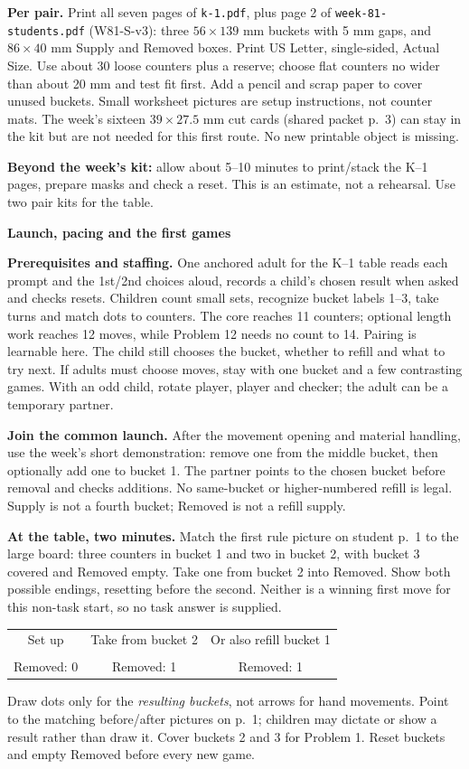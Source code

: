 \documentclass[11pt]{article}
\newcommand{\head}[1]{\par\textbf{\large #1}\par}
\newcommand{\buckets}[2]{%
\begin{tikzpicture}[x=1mm,y=1mm,baseline=0]
\foreach \x/\n/\lab in {0/#1/1,19/#2/2}{
 \draw[rounded corners=1mm] (\x,0) rectangle +(15,18);
 \node[font=\scriptsize] at (\x+7.5,-3) {\lab};
 \foreach \i in {1,...,\n}{
  \pgfmathsetmacro{\xx}{\x+3.5+mod(\i-1,3)*4}
  \pgfmathsetmacro{\yy}{3+floor((\i-1)/3)*4}
  \fill (\xx,\yy) circle (1.3);
 }
}
\end{tikzpicture}}
\begin{document}
\textbf{Per pair.} Print all seven pages of \texttt{k-1.pdf}, plus page 2 of \texttt{week-81-students.pdf} (W81-S-v3): three $56\times139$ mm buckets with 5 mm gaps, and $86\times40$ mm Supply and Removed boxes. Print US Letter, single-sided, Actual Size. Use about 30 loose counters plus a reserve; choose flat counters no wider than about 20 mm and test fit first. Add a pencil and scrap paper to cover unused buckets. Small worksheet pictures are setup instructions, not counter mats. The week's sixteen $39\times27.5$ mm cut cards (shared packet p.\ 3) can stay in the kit but are not needed for this first route. No new printable object is missing.

\textbf{Beyond the week's kit:} allow about 5--10 minutes to print/stack the K--1 pages, prepare masks and check a reset. This is an estimate, not a rehearsal. Use two pair kits for the table.
\newpage
\head{Launch, pacing and the first games}
\textbf{Prerequisites and staffing.} One anchored adult for the K--1 table reads each prompt and the 1st/2nd choices aloud, records a child's chosen result when asked and checks resets. Children count small sets, recognize bucket labels 1--3, take turns and match dots to counters. The core reaches 11 counters; optional length work reaches 12 moves, while Problem 12 needs no count to 14. Pairing is learnable here. The child still chooses the bucket, whether to refill and what to try next. If adults must choose moves, stay with one bucket and a few contrasting games. With an odd child, rotate player, player and checker; the adult can be a temporary partner.

\textbf{Join the common launch.} After the movement opening and material handling, use the week's short demonstration: remove one from the middle bucket, then optionally add one to bucket 1. The partner points to the chosen bucket before removal and checks additions. No same-bucket or higher-numbered refill is legal. Supply is not a fourth bucket; Removed is not a refill supply.

\textbf{At the table, two minutes.} Match the first rule picture on student p.\ 1 to the large board: three counters in bucket 1 and two in bucket 2, with bucket 3 covered and Removed empty. Take one from bucket 2 into Removed. Show both possible endings, resetting before the second. Neither is a winning first move for this non-task start, so no task answer is supplied.
\begin{center}\small
\begin{tabular}{ccc}
Set up & Take from bucket 2 & Or also refill bucket 1\\[3pt]
\buckets{3}{2} & \buckets{3}{1} & \buckets{4}{1}\\[7pt]
Removed: 0 & Removed: 1 & Removed: 1
\end{tabular}
\end{center}
Draw dots only for the \emph{resulting buckets}, not arrows for hand movements. Point to the matching before/after pictures on p.\ 1; children may dictate or show a result rather than draw it. Cover buckets 2 and 3 for Problem 1. Reset buckets and empty Removed before every new game.
\end{document}
